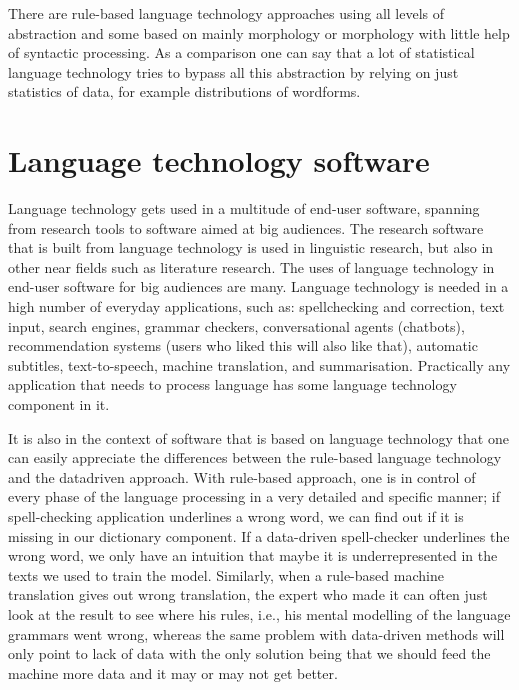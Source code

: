 \documentclass[free]{flammie}
\begin{document}
There are rule-based language technology approaches using all levels of
abstraction and some based on mainly morphology or morphology with little help
of syntactic processing.  As a comparison one can say that a lot of statistical
language technology tries to bypass all this abstraction by relying on just
statistics of data, for example distributions of wordforms.



\section{Language technology software}

Language technology gets used in a multitude of end-user software, spanning from
research tools to software aimed at big audiences. The research software that is
built from language technology is used in linguistic research, but also in other
near fields such as literature research. The uses of language technology in
end-user software for big audiences are many.  Language technology is needed in
a high number of everyday applications, such as: spellchecking and correction,
text input, search engines, grammar checkers, conversational agents (chatbots),
recommendation systems (users who liked this will also like that), automatic
subtitles, text-to-speech, machine translation, and summarisation. Practically
any application that needs to process language has some language technology
component in it.

It is also in the context of software that is based on language technology that
one can easily appreciate the differences between the rule-based language
technology and the datadriven approach. With rule-based approach, one is in
control of every phase of the language processing in a very detailed and
specific manner; if spell-checking application underlines a wrong word, we can
find out if it is missing in our dictionary component. If a data-driven
spell-checker underlines the wrong word, we only have an intuition that maybe it
is underrepresented in the texts we used to train the model. Similarly, when a
rule-based machine translation gives out wrong translation, the expert who made
it can often just look at the result to see where his rules, i.e., his mental
modelling of the language grammars went wrong, whereas the same problem with
data-driven methods will only point to lack of data with the only solution being
that we should feed the machine more data and it may or may not get better.
\end{document}
